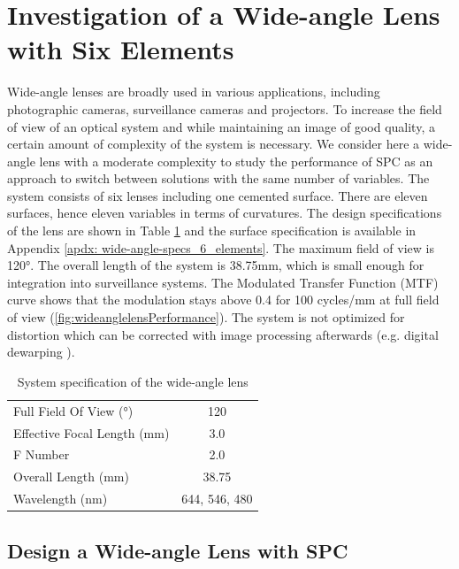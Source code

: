 \section{Investigation of a Wide-angle Lens with Six Elements}
Wide-angle lenses are broadly used in various applications, including photographic cameras, surveillance cameras and projectors. To increase the field of view of an optical system and while maintaining an image of good quality, a certain amount of complexity of the system is necessary. We consider here a wide-angle lens with a moderate complexity to study the performance of SPC as an approach to switch between solutions with the same number of variables. The system consists of six lenses including one cemented surface. There are eleven surfaces, hence eleven variables in terms of curvatures. The design specifications of the lens are shown in Table \ref{table: sysspecWAL} and the surface specification is available in Appendix \ref{apdx: wide-angle-specs_6_elements}. The maximum field of view is 120°. The overall length of the system is 38.75mm, which is small enough for integration into surveillance systems. The Modulated Transfer Function (MTF) curve shows that the modulation stays above 0.4 for 100 cycles/mm at full field of view (\ref{fig:wideanglelensPerformance}). The system is not optimized for distortion which can be corrected with image processing afterwards (e.g. digital dewarping \cite{Sahin:18DisCorrec}).



\setlength{\arrayrulewidth}{.5mm}
\setlength{\tabcolsep}{18pt}
\renewcommand{\arraystretch}{1.2}
\begin{table}[h!]
    \centering
    \captionsetup{justification=centering}
    \caption{System specification of the wide-angle lens}
    \label{table: sysspecWAL}
    \vspace{-1em}
    \begin{tabular}{ p{20em} c }
    \hline 
    Full Field Of View (°) & 120\\
    Effective Focal Length (mm) & 3.0\\
    F Number & 2.0\\
    Overall Length (mm) & 38.75\\
    Wavelength (nm) & 644, 546, 480\\ %
    \hline
    \end{tabular}
\end{table}

\subsection{Design a Wide-angle Lens with SPC}

